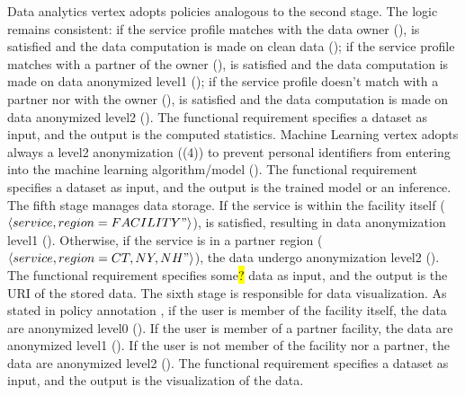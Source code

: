 Data analytics vertex adopts policies analogous to the second stage. The logic remains consistent:
if the service profile matches with the data owner (\pone),  is satisfied and the data computation is made on clean data ();
if the service profile matches with a partner of the owner (\ptwo),  is satisfied and the data computation is made on data anonymized level1 ();
if the service profile doesn't match with a partner nor with the owner (\pthree),  is satisfied and the data computation is made on data anonymized level2  ().
The functional requirement specifies a dataset as input, and the output is the computed statistics.
Machine Learning vertex adopts always a level2 anonymization (\p(4)) to prevent personal identifiers from entering into the machine learning algorithm/model ().
The functional requirement specifies a dataset as input, and the output is the trained model or an inference.
The fifth stage manages data storage.
If the service is within the facility itself ($\langle service,region=FACILITY"\rangle$),  is satisfied, resulting in data anonymization level1 ().
Otherwise, if the service is in a partner region ($\langle service,region={CT,NY,NH}"\rangle$), the data undergo anonymization level2 ().
The functional requirement specifies some\hl{?} data as input, and the output is the URI of the stored data.
The sixth stage is responsible for data visualization.
As stated in policy annotation , if the user is member of the facility itself, the data are anonymized level0 ().
If the user is member of a partner facility, the data are anonymized level1 ().
If the user is not member of the facility nor a partner, the data are anonymized level2 ().
The functional requirement specifies a dataset as input, and the output is the visualization of the data.


